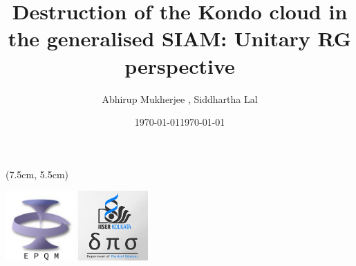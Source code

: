\documentclass[aspectratio=169]{beamer}
\title{
\LARGE{Destruction of the Kondo cloud in the generalised SIAM: Unitary RG perspective
}
}
\date{\today}
\author{\large Abhirup Mukherjee \inst{1}, Siddhartha Lal \inst{1}}
\institute{\small\inst{1} Department of Physical Sciences,IISER Kolkata}
\date{\large\today}
\begin{document}
\begin{frame}[noframenumbering]
\maketitle
\begin{textblock*}{0.7\textwidth}(7.5cm, 5.5cm)
	\centering
	\vspace*{\fill}

	\hspace*{\fill}
	\includegraphics[width=0.2\textwidth]{figures/epqm_logo_mod.jpeg}
	\includegraphics[width=0.2\textwidth]{figures/dps_logo.jpeg}
	\hspace*{\fill}

	\vspace*{\fill}
\end{textblock*}
\end{frame}
\end{document}
